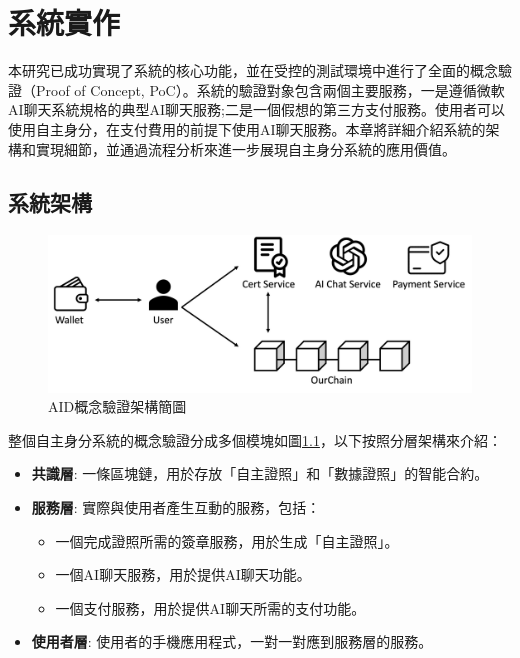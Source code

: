 
\chapter{系統實作}
本研究已成功實現了系統的核心功能，並在受控的測試環境中進行了全面的概念驗證（Proof of Concept, PoC）。系統的驗證對象包含兩個主要服務，一是遵循微軟AI聊天系統規格\cite{microsoft_ai_chat_protocol}的典型AI聊天服務;二是一個假想的第三方支付服務。使用者可以使用自主身分，在支付費用的前提下使用AI聊天服務。本章將詳細介紹系統的架構和實現細節，並通過流程分析來進一步展現自主身分系統的應用價值。
\section{系統架構}
\begin{figure}
  \centering
  \includegraphics[width=\linewidth, keepaspectratio]{figures/implement.png}
  \caption{AID概念驗證架構簡圖}
  \label{fig:implement}
\end{figure}
整個自主身分系統的概念驗證分成多個模塊如圖\ref{fig:implement}，以下按照分層架構來介紹：
\begin{itemize}
  \item \textbf{共識層}: 一條區塊鏈，用於存放「自主證照」和「數據證照」的智能合約。
  \item \textbf{服務層}: 實際與使用者產生互動的服務，包括：
        \begin{itemize}
          \item 一個完成證照所需的簽章服務，用於生成「自主證照」。
          \item 一個AI聊天服務，用於提供AI聊天功能。
          \item 一個支付服務，用於提供AI聊天所需的支付功能。
        \end{itemize}
  \item \textbf{使用者層}: 使用者的手機應用程式，一對一對應到服務層的服務。
\end{itemize}
